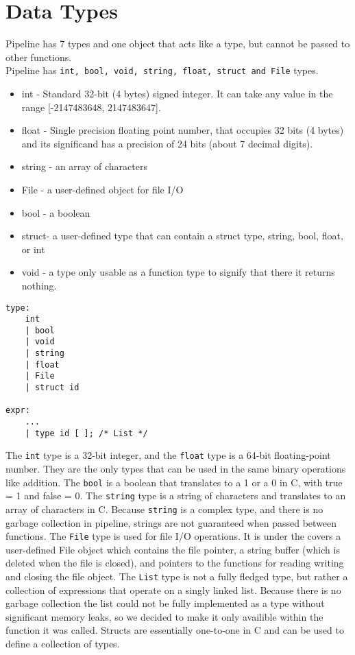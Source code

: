 \documentclass[./LRM_main.tex]{subfiles}
\begin{document}
\section{Data Types}
Pipeline has 7 types and one object that acts like a type, but cannot be passed to other functions. \\
Pipeline has \texttt{int, bool, void, string, float, struct and File} types.
\begin{itemize}
    \item int -  Standard 32-bit (4 bytes) signed integer. It can take any value in the range [-2147483648, 2147483647].
    \item float - Single precision floating point number, that occupies 32 bits (4 bytes) and its significand has a precision of 24 bits (about 7 decimal digits). 
    \item string - an array of characters
    \item File - a user-defined object for file I/O
    \item bool - a boolean
    \item struct- a user-defined type that can contain a struct type, string, bool, float, or int
    \item void - a type only usable as a function type to signify that there it returns nothing.
\end{itemize}
\begin{lstlisting}
type:
    int
    | bool
    | void
    | string
    | float
    | File
    | struct id

expr:
	...
	| type id [ ]; /* List */

\end{lstlisting}
The \texttt{int} type is a 32-bit integer, and the \texttt{float} type is a 64-bit floating-point number. They are the only types that can be used in the same binary operations like addition. The \texttt{bool} is a boolean that translates to a 1 or a 0 in C, with true = 1 and false = 0. The \texttt{string} type is a string of characters and translates to an array of characters in C. Because \texttt{string} is a complex type, and there is no garbage collection in pipeline, strings are not guaranteed when passed between functions. The \texttt{File} type is used for file I/O operations. It is under the covers a user-defined File object which contains the file pointer, a string buffer (which is deleted when the file is closed), and pointers to the functions for reading writing and closing the file object. The \texttt{List} type is not a fully fledged type, but rather a collection of expressions that operate on a singly linked list. Because there is no garbage collection the list could not be fully implemented as a type without significant memory leaks, so we decided to make it only availible within the function it was called. Structs are essentially one-to-one in C and can be used to define a collection of types.
\end{document}
